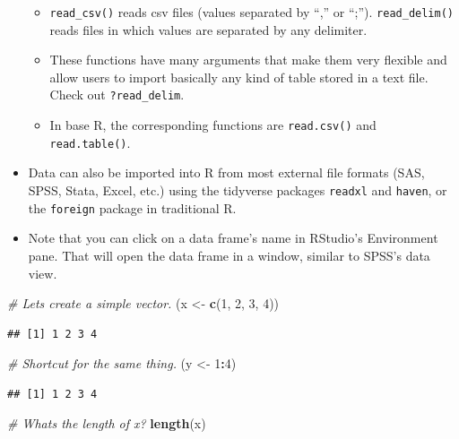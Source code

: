 \documentclass[
]{book}
\newenvironment{Shaded}{\begin{snugshade}}{\end{snugshade}}
\newcommand{\CommentTok}[1]{\textcolor[rgb]{0.56,0.35,0.01}{\textit{#1}}}
\newcommand{\DecValTok}[1]{\textcolor[rgb]{0.00,0.00,0.81}{#1}}
\newcommand{\FunctionTok}[1]{\textcolor[rgb]{0.13,0.29,0.53}{\textbf{#1}}}
\newcommand{\NormalTok}[1]{#1}
\newcommand{\OtherTok}[1]{\textcolor[rgb]{0.56,0.35,0.01}{#1}}
\newcommand{\SpecialCharTok}[1]{\textcolor[rgb]{0.81,0.36,0.00}{\textbf{#1}}}
\providecommand{\tightlist}{%
  \setlength{\itemsep}{0pt}\setlength{\parskip}{0pt}}
\begin{document}
\begin{itemize}
  \begin{itemize}
  \tightlist
  \item
    \texttt{read\_csv()} reads csv files (values separated by ``,'' or ``;''). \texttt{read\_delim()} reads files in which values are separated by any delimiter.
  \item
    These functions have many arguments that make them very flexible and allow users to import basically any kind of table stored in a text file. Check out \texttt{?read\_delim}.
  \item
    In base R, the corresponding functions are \texttt{read.csv()} and \texttt{read.table()}.
  \end{itemize}
\item
  Data can also be imported into R from most external file formats (SAS, SPSS, Stata, Excel, etc.) using the tidyverse packages \texttt{readxl} and \texttt{haven}, or the \texttt{foreign} package in traditional R.
\item
  Note that you can click on a data frame's name in RStudio's Environment pane. That will open the data frame in a window, similar to SPSS's data view.
\end{itemize}

\begin{Shaded}
\begin{Highlighting}[]
\CommentTok{\# Let\textquotesingle{}s create a simple vector.}
\NormalTok{(x }\OtherTok{\textless{}{-}} \FunctionTok{c}\NormalTok{(}\DecValTok{1}\NormalTok{, }\DecValTok{2}\NormalTok{, }\DecValTok{3}\NormalTok{, }\DecValTok{4}\NormalTok{))}
\end{Highlighting}
\end{Shaded}

\begin{verbatim}
## [1] 1 2 3 4
\end{verbatim}

\begin{Shaded}
\begin{Highlighting}[]
\CommentTok{\# Shortcut for the same thing.}
\NormalTok{(y }\OtherTok{\textless{}{-}} \DecValTok{1}\SpecialCharTok{:}\DecValTok{4}\NormalTok{)}
\end{Highlighting}
\end{Shaded}

\begin{verbatim}
## [1] 1 2 3 4
\end{verbatim}

\begin{Shaded}
\begin{Highlighting}[]
\CommentTok{\# What\textquotesingle{}s the length of x?}
\FunctionTok{length}\NormalTok{(x)}
\end{Highlighting}
\end{Shaded}
\end{document}
